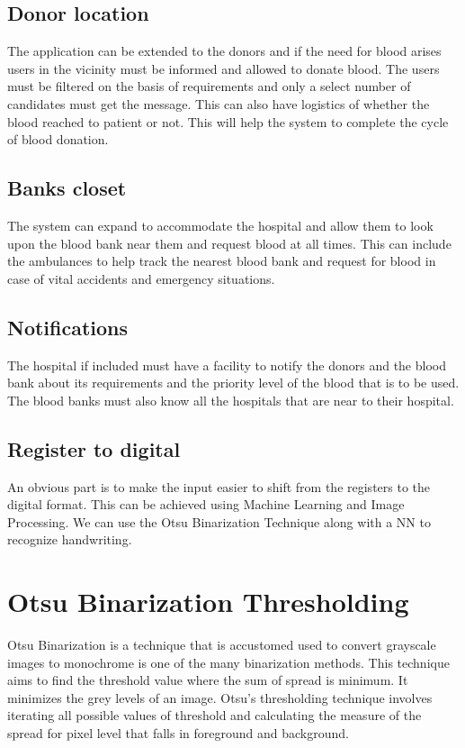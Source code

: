 \documentclass[BTech]{srmuthesis}
\begin{document}
\section{Donor location}
The application can be extended to the donors and if the need for blood arises users in the vicinity must be informed and allowed to donate blood. The users must be filtered on the basis of requirements and only a select number of candidates must get the message. This can also have logistics of whether the blood reached to patient or not. This will help the system to complete the cycle of blood donation.
\section{Banks closet}
The system can expand to accommodate the hospital and allow them to look upon the blood bank near them and request blood at all times. This can include the ambulances to help track the nearest blood bank and request for blood in case of vital accidents and emergency situations.
\section{Notifications}
The hospital if included must have a facility to notify the donors and the blood bank about its requirements and the priority level of the blood that is to be used. The blood banks must also know all the hospitals that are near to their hospital.
\section{Register to digital}
An obvious part is to make the input easier to shift from the registers to the digital format. This can be achieved using Machine Learning and Image Processing. We can use the Otsu Binarization Technique along with a NN to recognize handwriting.



\appendix
\chapter{Otsu Binarization Thresholding}
Otsu Binarization is a technique that is accustomed used to convert grayscale images to monochrome is one of the many binarization methods.
This technique aims to find the threshold value where the sum of spread is minimum. It minimizes the grey levels of an image. Otsu’s thresholding technique involves iterating all possible values of threshold and calculating the measure of the spread for pixel level that falls in foreground and background.
\end{document}
